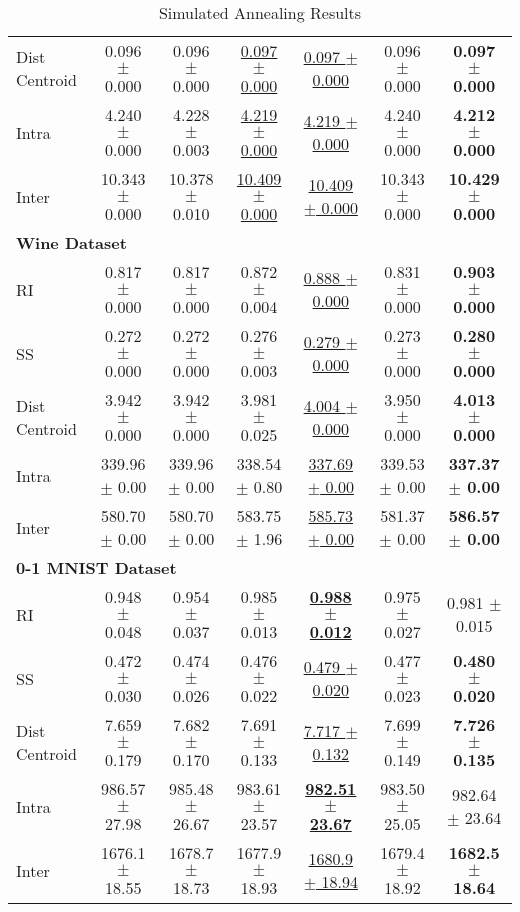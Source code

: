 \documentclass[showpacs,twocolumn,superscriptaddress]{revtex4-2}
\begin{document}
\begin{table*}[!ht]
\begin{tabular}{lcccccc}
    Dist Centroid & 0.096 $\pm$ 0.000 & 0.096 $\pm$ 0.000 & \underline{0.097 $\pm$ 0.000} & \underline{0.097 $\pm$ 0.000} & 0.096 $\pm$ 0.000 & \textbf{0.097 $\pm$ 0.000} \\
    Intra & 4.240 $\pm$ 0.000 & 4.228 $\pm$ 0.003 & \underline{4.219 $\pm$ 0.000} & \underline{4.219 $\pm$ 0.000} & 4.240 $\pm$ 0.000 & \textbf{4.212 $\pm$ 0.000} \\
    Inter & 10.343 $\pm$ 0.000 & 10.378 $\pm$ 0.010 & \underline{10.409 $\pm$ 0.000} & \underline{10.409 $\pm$ 0.000} & 10.343 $\pm$ 0.000 & \textbf{10.429 $\pm$ 0.000} \\
    \midrule
    \multicolumn{7}{l}{\textbf{Wine Dataset}} \\
    RI & 0.817 $\pm$ 0.000 & 0.817 $\pm$ 0.000 & 0.872 $\pm$ 0.004 & \underline{0.888 $\pm$ 0.000} & 0.831 $\pm$ 0.000 & \textbf{0.903 $\pm$ 0.000} \\
    SS & 0.272 $\pm$ 0.000 & 0.272 $\pm$ 0.000 & 0.276 $\pm$ 0.003 & \underline{0.279 $\pm$ 0.000} & 0.273 $\pm$ 0.000 & \textbf{0.280 $\pm$ 0.000} \\
    Dist Centroid & 3.942 $\pm$ 0.000 & 3.942 $\pm$ 0.000 & 3.981 $\pm$ 0.025 & \underline{4.004 $\pm$ 0.000} & 3.950 $\pm$ 0.000 & \textbf{4.013 $\pm$ 0.000} \\
    Intra & 339.96 $\pm$ 0.00 & 339.96 $\pm$ 0.00 & 338.54 $\pm$ 0.80 & \underline{337.69 $\pm$ 0.00} & 339.53 $\pm$ 0.00 & \textbf{337.37 $\pm$ 0.00} \\
    Inter & 580.70 $\pm$ 0.00 & 580.70 $\pm$ 0.00 & 583.75 $\pm$ 1.96 & \underline{585.73 $\pm$ 0.00} & 581.37 $\pm$ 0.00 & \textbf{586.57 $\pm$ 0.00} \\
    \midrule
    \multicolumn{7}{l}{\textbf{0-1 MNIST Dataset}} \\
    RI & 0.948 $\pm$ 0.048 & 0.954 $\pm$ 0.037 & 0.985 $\pm$ 0.013 & \underline{\textbf{0.988 $\pm$ 0.012}} & 0.975 $\pm$ 0.027 & 0.981 $\pm$ 0.015 \\
    SS & 0.472 $\pm$ 0.030 & 0.474 $\pm$ 0.026 & 0.476 $\pm$ 0.022 & \underline{0.479 $\pm$ 0.020} & 0.477 $\pm$ 0.023 & \textbf{0.480 $\pm$ 0.020} \\
    Dist Centroid & 7.659 $\pm$ 0.179 & 7.682 $\pm$ 0.170 & 7.691 $\pm$ 0.133 & \underline{7.717 $\pm$ 0.132} & 7.699 $\pm$ 0.149 & \textbf{7.726 $\pm$ 0.135} \\
    Intra & 986.57 $\pm$ 27.98 & 985.48 $\pm$ 26.67 & 983.61 $\pm$ 23.57 & \underline{\textbf{982.51 $\pm$ 23.67}} & 983.50 $\pm$ 25.05 & 982.64 $\pm$ 23.64 \\
    Inter & 1676.1 $\pm$ 18.55 & 1678.7 $\pm$ 18.73 & 1677.9 $\pm$ 18.93 & \underline{1680.9 $\pm$ 18.94} & 1679.4 $\pm$ 18.92 & \textbf{1682.5 $\pm$ 18.64} \\
    \bottomrule
    \end{tabular}
    \caption{Simulated Annealing Results}
\end{table*}
\end{document}

